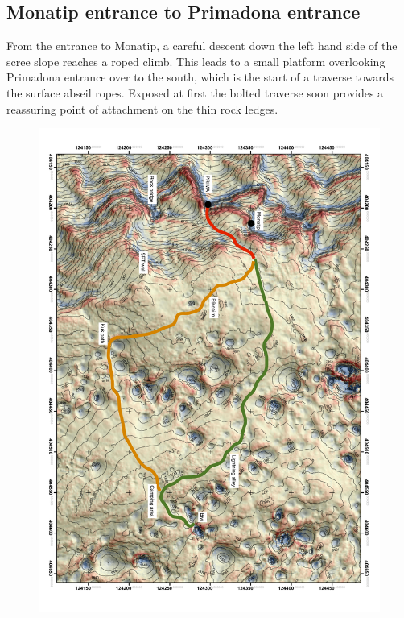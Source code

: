 \subsection{Monatip entrance to Primadona entrance}
From the entrance to Monatip, a careful descent down the left hand side of the scree slope reaches a roped climb. This leads to a small platform overlooking Primadona entrance over to the south, which is the start of a traverse towards the surface abseil ropes. Exposed at first  the bolted traverse soon provides a reassuring point of attachment on the thin rock ledges.

\begin{figure}[t!]
\centering
\includegraphics[height=\textheight]{curvature prima.pdf}
\label{}
\end{figure}

